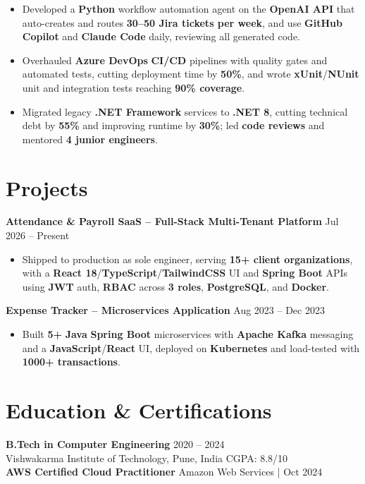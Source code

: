 \documentclass[a4paper,10pt]{article}
\begin{document}
\begin{itemize}[leftmargin=*]
    \item Developed a \textbf{Python} workflow automation agent on the \textbf{OpenAI API} that auto-creates and routes \textbf{30--50 Jira tickets per week}, and use \textbf{GitHub Copilot} and \textbf{Claude Code} daily, reviewing all generated code.
    \item Overhauled \textbf{Azure DevOps} \textbf{CI/CD} pipelines with quality gates and automated tests, cutting deployment time by \textbf{50\%}, and wrote \textbf{xUnit}/\textbf{NUnit} unit and integration tests reaching \textbf{90\% coverage}.
    \item Migrated legacy \textbf{.NET Framework} services to \textbf{.NET 8}, cutting technical debt by \textbf{55\%} and improving runtime by \textbf{30\%}; led \textbf{code reviews} and mentored \textbf{4 junior engineers}.
\end{itemize}

\section*{Projects}

\textbf{Attendance \& Payroll SaaS -- Full-Stack Multi-Tenant Platform} \hfill Jul 2026 -- Present
\begin{itemize}[leftmargin=*]
    \item Shipped to production as sole engineer, serving \textbf{15+ client organizations}, with a \textbf{React 18}/\textbf{TypeScript}/\textbf{TailwindCSS} UI and \textbf{Spring Boot} APIs using \textbf{JWT} auth, \textbf{RBAC} across \textbf{3 roles}, \textbf{PostgreSQL}, and \textbf{Docker}.
\end{itemize}

\textbf{Expense Tracker -- Microservices Application} \hfill Aug 2023 -- Dec 2023
\begin{itemize}[leftmargin=*]
    \item Built \textbf{5+} \textbf{Java} \textbf{Spring Boot} microservices with \textbf{Apache Kafka} messaging and a \textbf{JavaScript}/\textbf{React} UI, deployed on \textbf{Kubernetes} and load-tested with \textbf{1000+ transactions}.
\end{itemize}

\section*{Education \& Certifications}
\textbf{B.Tech in Computer Engineering} \hfill 2020 -- 2024 \\
Vishwakarma Institute of Technology, Pune, India \hfill CGPA: 8.8/10 \\
\textbf{AWS Certified Cloud Practitioner} \hfill Amazon Web Services \;|\; Oct 2024
\end{document}
